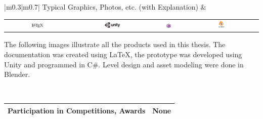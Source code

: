 \pagebreak
\noindent
\begin{tabular}{|m{0.3\textwidth}|m{0.7\textwidth}|}
\hline
Typical Graphics, Photos, etc. (with Explanation) &
\begin{minipage}{\linewidth}
  \centering
  \begin{tabular}{cccc}
    \includegraphics[width=0.2\textwidth]{chapters/00/images/latex.png} &
    \includegraphics[width=0.2\textwidth]{chapters/00/images/unity.png} &
    \includegraphics[width=0.2\textwidth]{chapters/00/images/Csharp.png} &
    \includegraphics[width=0.2\textwidth]{chapters/00/images/blender.png}
  \end{tabular}
  
  \vspace{10pt}
  
  \begin{flushleft}
    The following images illustrate all the products used in this thesis. The documentation was created using LaTeX, the prototype was developed using Unity and programmed in C\#. Level design and asset modeling were done in Blender.
  \end{flushleft}
  
  \vspace{10pt}
  
\end{minipage} \\
\hline
\end{tabular}


\vspace{10pt}

\noindent
\begin{tabular}{|m{}|m{}|}
\hline
Participation in Competitions, Awards & None \\
\hline
\end{tabular}

